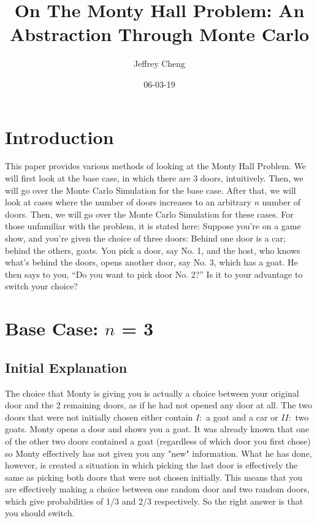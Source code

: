 \documentclass{article}
\title{On The Monty Hall Problem: An Abstraction Through Monte Carlo}
\date{06-03-19}
\author{Jeffrey Cheng}
\begin{document}
\maketitle
{}
\newpage
{}

\section{Introduction}
This paper provides various methods of looking at the Monty Hall Problem. We will first look at the base case, in which there are 3 doors, intuitively. Then, we will go over the Monte Carlo Simulation for the base case. After that, we will look at cases where the number of doors increases to an arbitrary $n$ number of doors. Then, we will go over the Monte Carlo Simulation for these cases. 
\break \break
For those unfamiliar with the problem, it is stated here: Suppose you’re on a game show, and you’re given the choice of three doors: Behind one door is a car; behind the others, goats. You pick a door, say No. 1, and the host, who knows what’s behind the doors, opens another door, say No. 3, which has a goat. He then says to you, “Do you want to pick door No. 2?” Is it to your advantage to switch your choice?

\section{Base Case: $n$ = 3}

\subsection{Initial Explanation}
The choice that Monty is giving you is actually a choice between your original door and the 2 remaining doors, as if he had not opened any door at all. The two doors that were not initially chosen either contain $I:$ a goat and a car or $II:$ two goats. Monty opens a door and shows you a goat. It was already known that one of the other two doors contained a goat (regardless of which door you first chose) so Monty effectively has not given you any "new" information. What he has done, however, is created a situation in which picking the last door is effectively the same as picking both doors that were not chosen initially. This means that you are effectively making a choice between one random door and two random doors, which give probabilities of 1/3 and 2/3 respectively. So the right answer is that you should switch.
\end{document}
